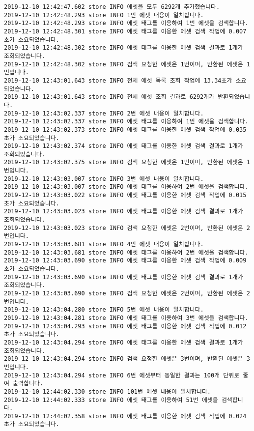 \begin{Verbatim}[fontsize=\tiny, breaklines=true, breakanywhere=true]
2019-12-10 12:42:47.602 store INFO 에셋을 모두 6292개 추가했습니다.
2019-12-10 12:42:48.293 store INFO 1번 에셋 내용이 일치합니다.
2019-12-10 12:42:48.293 store INFO 에셋 태그를 이용하여 1번 에셋을 검색합니다.
2019-12-10 12:42:48.301 store INFO 에셋 태그를 이용한 에셋 검색 작업에 0.007초가 소요되었습니다.
2019-12-10 12:42:48.302 store INFO 에셋 태그를 이용한 에셋 검색 결과로 1개가 조회되었습니다.
2019-12-10 12:42:48.302 store INFO 검색 요청한 에셋은 1번이며, 반환된 에셋은 1번입니다.
2019-12-10 12:43:01.643 store INFO 전체 에셋 목록 조회 작업에 13.34초가 소요되었습니다.
2019-12-10 12:43:01.643 store INFO 전체 에셋 조회 결과로 6292개가 반환되었습니다.
2019-12-10 12:43:02.337 store INFO 2번 에셋 내용이 일치합니다.
2019-12-10 12:43:02.337 store INFO 에셋 태그를 이용하여 1번 에셋을 검색합니다.
2019-12-10 12:43:02.373 store INFO 에셋 태그를 이용한 에셋 검색 작업에 0.035초가 소요되었습니다.
2019-12-10 12:43:02.374 store INFO 에셋 태그를 이용한 에셋 검색 결과로 1개가 조회되었습니다.
2019-12-10 12:43:02.375 store INFO 검색 요청한 에셋은 1번이며, 반환된 에셋은 1번입니다.
2019-12-10 12:43:03.007 store INFO 3번 에셋 내용이 일치합니다.
2019-12-10 12:43:03.007 store INFO 에셋 태그를 이용하여 2번 에셋을 검색합니다.
2019-12-10 12:43:03.022 store INFO 에셋 태그를 이용한 에셋 검색 작업에 0.015초가 소요되었습니다.
2019-12-10 12:43:03.023 store INFO 에셋 태그를 이용한 에셋 검색 결과로 1개가 조회되었습니다.
2019-12-10 12:43:03.023 store INFO 검색 요청한 에셋은 2번이며, 반환된 에셋은 2번입니다.
2019-12-10 12:43:03.681 store INFO 4번 에셋 내용이 일치합니다.
2019-12-10 12:43:03.681 store INFO 에셋 태그를 이용하여 2번 에셋을 검색합니다.
2019-12-10 12:43:03.690 store INFO 에셋 태그를 이용한 에셋 검색 작업에 0.009초가 소요되었습니다.
2019-12-10 12:43:03.690 store INFO 에셋 태그를 이용한 에셋 검색 결과로 1개가 조회되었습니다.
2019-12-10 12:43:03.690 store INFO 검색 요청한 에셋은 2번이며, 반환된 에셋은 2번입니다.
2019-12-10 12:43:04.280 store INFO 5번 에셋 내용이 일치합니다.
2019-12-10 12:43:04.281 store INFO 에셋 태그를 이용하여 3번 에셋을 검색합니다.
2019-12-10 12:43:04.293 store INFO 에셋 태그를 이용한 에셋 검색 작업에 0.012초가 소요되었습니다.
2019-12-10 12:43:04.294 store INFO 에셋 태그를 이용한 에셋 검색 결과로 1개가 조회되었습니다.
2019-12-10 12:43:04.294 store INFO 검색 요청한 에셋은 3번이며, 반환된 에셋은 3번입니다.
2019-12-10 12:43:04.294 store INFO 6번 에셋부터 동일한 결과는 100개 단위로 줄여 출력합니다.
2019-12-10 12:44:02.330 store INFO 101번 에셋 내용이 일치합니다.
2019-12-10 12:44:02.333 store INFO 에셋 태그를 이용하여 51번 에셋을 검색합니다.
2019-12-10 12:44:02.358 store INFO 에셋 태그를 이용한 에셋 검색 작업에 0.024초가 소요되었습니다.

\end{Verbatim}
